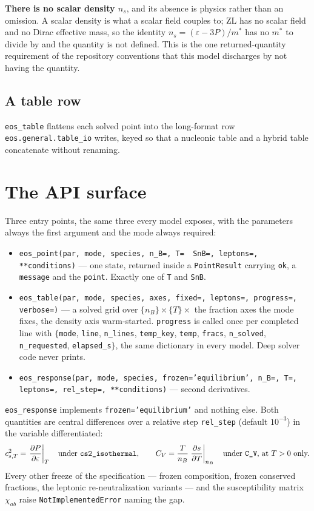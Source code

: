 \documentclass[aps,prc,onecolumn,superscriptaddress,nofootinbib,10pt]{revtex4-2}
\newcommand{\nB}{n_B}
\begin{document}
\textbf{There is no scalar density $n_s$}, and its absence is physics rather
than an omission. A scalar density is what a scalar field couples to; ZL has
no scalar field and no Dirac effective mass, so the identity
$n_s = (\varepsilon - 3P)/m^*$ has no $m^*$ to divide by and the quantity is
not defined. This is the one returned-quantity requirement of the repository
conventions that this model discharges by not having the quantity.

\subsection{A table row}

\texttt{eos\_table} flattens each solved point into the long-format row
\texttt{eos.general.table\_io} writes, keyed so that a nucleonic table and a
hybrid table concatenate without renaming.

\section{The API surface}
\label{sec:api}

Three entry points, the same three every model exposes, with the parameters
always the first argument and the mode always required:
%
\begin{itemize}
\item \texttt{eos\_point(par, mode, species, n\_B=, T= \textbar\ SnB=,
      leptons=, **conditions)} --- one state, returned inside a
      \texttt{PointResult} carrying \texttt{ok}, a \texttt{message} and the
      \texttt{point}. Exactly one of \texttt{T} and \texttt{SnB}.
\item \texttt{eos\_table(par, mode, species, axes, fixed=, leptons=,
      progress=, verbose=)} --- a solved grid over
      $\{\nB\} \times \{T\} \times$ the fraction axes the mode fixes, the
      density axis warm-started. \texttt{progress} is called once per
      completed line with $\{$\texttt{mode}, \texttt{line}, \texttt{n\_lines},
      \texttt{temp\_key}, \texttt{temp}, \texttt{fracs}, \texttt{n\_solved},
      \texttt{n\_requested}, \texttt{elapsed\_s}$\}$, the same dictionary in
      every model. Deep solver code never prints.
\item \texttt{eos\_response(par, mode, species, frozen='equilibrium', n\_B=,
      T=, leptons=, rel\_step=, **conditions)} --- second derivatives.
\end{itemize}

\texttt{eos\_response} implements \texttt{frozen='equilibrium'} and nothing
else. Both quantities are central differences over a relative step
\texttt{rel\_step} (default $10^{-3}$) in the variable differentiated:
%
\begin{equation}
c_{s,T}^2 = \left.\frac{\partial P}{\partial\varepsilon}\right|_{T}
\quad\text{under \texttt{cs2\_isothermal}} ,
\qquad
C_V = \frac{T}{\nB}\left.\frac{\partial s}{\partial T}\right|_{\nB}
\quad\text{under \texttt{C\_V}, at $T > 0$ only.}
\end{equation}
%
Every other freeze of the specification --- frozen composition, frozen
conserved fractions, the leptonic re-neutralization variants --- and the
susceptibility matrix $\chi_{ab}$ raise \texttt{NotImplementedError} naming
the gap.
\end{document}
